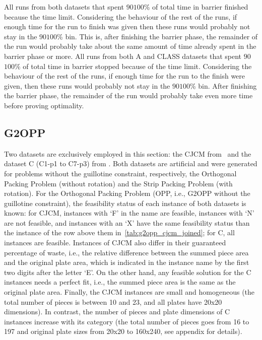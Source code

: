 All runs from both datasets that spent \(90\)\tilderange\(100\)\% of total time in barrier finished because the time limit.
Considering the behaviour of the rest of the runs, if enough time for the run to finish was given then these runs would probably not stay in the \(90\)\tilderange\( 100\)\% bin.
This is, after finishing the barrier phase, the remainder of the run would probably take about the same amount of time already spent in the barrier phase or more.
All runs from both A and CLASS datasets that spent \(90\)\tilderange\(100\)\% of total time in barrier stopped because of the time limit. Considering the behaviour of the rest of the runs, if enough time for the run to the finish were given, then these runs would probably not stay in the \(90\)\tilderange\( 100\)\% bin.
After finishing the barrier phase, the remainder of the run would probably take even more time before proving optimality.

\subsection{G2OPP}

Two datasets are exclusively employed in this section: the CJCM from~\citet{clautiaux:2007} and the dataset C (C1-p1 to C7-p3) from \citet{hopper:2001}.
Both datasets are artificial and were generated for problems without the guillotine constraint, respectively, the Orthogonal Packing Problem (without rotation) and the Strip Packing Problem (with rotation).
For the Orthogonal Packing Problem (OPP, i.e., G2OPP without the guillotine constraint), the feasibility status of each instance of both datasets is known: for CJCM, instances with `F' in the name are feasible, instances with `N' are not feasible, and instances with an `X' have the same feasibility status than the instance of the row above them in~\cref{tab:g2opp_cjcm_joined}; for C, all instances are feasible.
Instances of CJCM also differ in their guaranteed percentage of waste, i.e., the relative difference between the summed piece area and the original plate area, which is indicated in the instance name by the first two digits after the letter `E'.
On the other hand, any feasible solution for the C instances needs a perfect fit, i.e., the summed piece area is the same as the original plate area.
Finally, the CJCM instances are small and homogeneous (the total number of pieces is between 10 and 23, and all plates have 20x20 dimensions).
In contrast, the number of pieces and plate dimensions of C instances increase with its category (the total number of pieces goes from 16 to 197 and original plate sizes from 20x20 to 160x240, see appendix for details).

